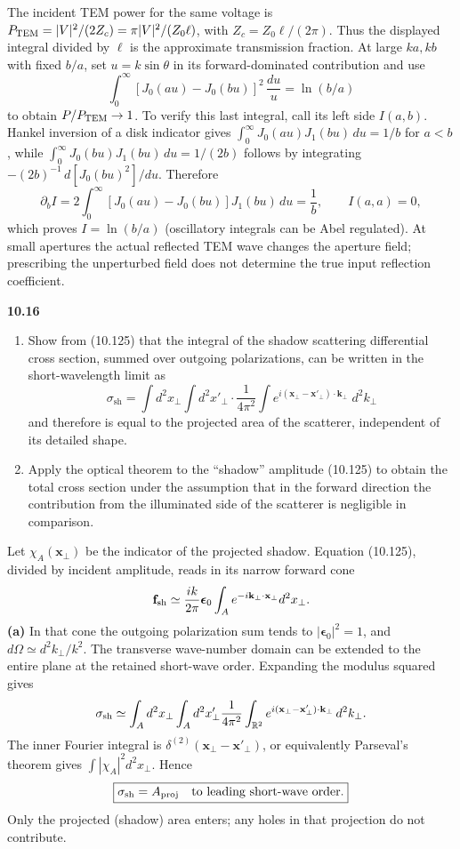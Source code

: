 The incident TEM power for the same voltage is
$P_{\rm TEM}=|V|^2/(2Z_c)=\pi|V|^2/(Z_0\ell)$, with
$Z_c=Z_0\ell/(2\pi)$. Thus the displayed integral divided by $\ell$ is
the approximate transmission fraction. At large $ka,kb$ with fixed
$b/a$, set $u=k\sin\theta$ in its forward-dominated contribution and use
\[
\int_0^\infty[J_0(au)-J_0(bu)]^2\,\frac{du}{u}=\ln(b/a)
\]
to obtain $P/P_{\rm TEM}\to1$. To verify this last integral, call its
left side $I(a,b)$. Hankel inversion of a disk indicator gives
$\int_0^\infty J_0(au)J_1(bu)\,du=1/b$ for $a<b$, while
$\int_0^\infty J_0(bu)J_1(bu)\,du=1/(2b)$ follows by integrating
$-(2b)^{-1}\,d[J_0(bu)^2]/du$. Therefore
\[
\partial_b I=2\int_0^\infty[J_0(au)-J_0(bu)]J_1(bu)\,du
=\frac1b,\qquad I(a,a)=0,
\]
which proves $I=\ln(b/a)$ (oscillatory integrals can be Abel regulated).
At small apertures the actual reflected
TEM wave changes the aperture field; prescribing the unperturbed field
does not determine the true input reflection coefficient.

\par\bigskip
\noindent\textbf{10.16}\quad\begin{enumerate}
\item[(a)] Show from (10.125) that the integral of the shadow scattering differential cross section, summed over outgoing polarizations, can be written in the short-wavelength limit as
\[
\sigma_{\mathrm{sh}}=\int d^{2}x_{\perp}\int d^{2}x'_{\perp}\cdot\frac{1}{4\pi^{2}}\int e^{i(\mathbf{x}_{\perp}-\mathbf{x}'_{\perp})\cdot\mathbf{k}_{\perp}}\;d^{2}k_{\perp}
\]
and therefore is equal to the projected area of the scatterer, independent of its detailed shape.
\item[(b)] Apply the optical theorem to the ``shadow'' amplitude (10.125) to obtain the total cross section under the assumption that in the forward direction the contribution from the illuminated side of the scatterer is negligible in comparison.
\end{enumerate}
\solution
Let $\chi_A(\mathbf x_\perp)$ be the indicator of the projected shadow.
Equation (10.125), divided by incident amplitude, reads in its narrow
forward cone
\[
\mathbf f_{\rm sh}\simeq\frac{ik}{2\pi}
\boldsymbol\epsilon_0\int_A e^{-i\mathbf k_\perp\cdot\mathbf x_\perp}
d^2x_\perp .
\]
\textbf{(a)} In that cone the outgoing polarization sum tends to
$|\boldsymbol\epsilon_0|^2=1$, and
$d\Omega\simeq d^2k_\perp/k^2$. The transverse wave-number domain can
be extended to the entire plane at the retained short-wave order.
Expanding the modulus squared gives
\[
\sigma_{\rm sh}\simeq\int_A d^2x_\perp\int_A d^2x'_\perp
\frac1{4\pi^2}\int_{\mathbb R^2}
e^{i(\mathbf x_\perp-\mathbf x'_\perp)\cdot\mathbf k_\perp}
\,d^2k_\perp .
\]
The inner Fourier integral is
$\delta^{(2)}(\mathbf x_\perp-\mathbf x'_\perp)$, or equivalently
Parseval's theorem gives $\int|\chi_A|^2d^2x_\perp$. Hence
\[
\boxed{\sigma_{\rm sh}=A_{\rm proj}\quad\hbox{to leading short-wave order}.}
\]
Only the projected (shadow) area enters; any holes in that projection do not contribute.

